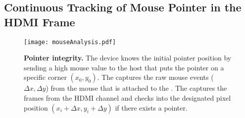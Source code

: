 



\subsection{Continuous Tracking of Mouse Pointer in the HDMI Frame}
\label{sec:systemDesign:analysis}


\begin{figure}[t]
\centering
\texttt{[image: mouseAnalysis.pdf]}
\caption{\textbf{Pointer integrity.} The device knows the initial pointer position by sending a high mouse value to the host that puts the pointer on a specific corner $(x_0, y_0)$. \one The \device captures the raw mouse events ($\Delta x, \Delta y$) from the mouse that is attached to the \device. \two The \device captures the frames from the HDMI channel and checks into the designated pixel position $(x_i + \Delta x, y_i + \Delta y)$ if there exists a pointer.}
\spacesave
\label{fig:mouseAnalysis}
\centering
\end{figure}

